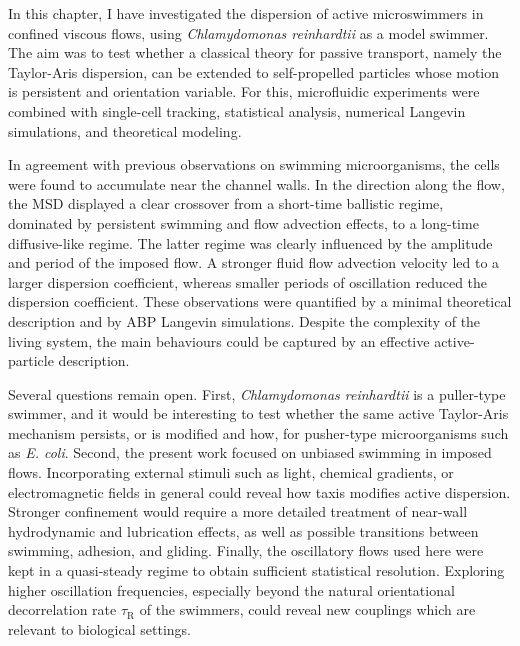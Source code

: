 In this chapter, I have investigated the dispersion of active microswimmers in confined viscous flows, using \textit{Chlamydomonas reinhardtii} as a model swimmer. The aim was to test whether a classical theory for passive transport, namely the Taylor-Aris dispersion, can be extended to self-propelled particles whose motion is persistent and orientation variable. For this, microfluidic experiments were combined with single-cell tracking, statistical analysis, numerical Langevin simulations, and theoretical modeling.

In agreement with previous observations on swimming microorganisms, the cells were found to accumulate near the channel walls. In the direction along the flow, the MSD displayed a clear crossover from a short-time ballistic regime, dominated by persistent swimming and flow advection effects, to a long-time diffusive-like regime. The latter regime was clearly influenced by the amplitude and period of the imposed flow. A stronger fluid flow advection velocity led to a larger dispersion coefficient, whereas smaller periods of oscillation reduced the dispersion coefficient. These observations were quantified by a minimal theoretical description and by ABP Langevin simulations. Despite the complexity of the living system, the main behaviours could be captured by an effective active-particle description.

Several questions remain open. First, \textit{Chlamydomonas reinhardtii} is a puller-type swimmer, and it would be interesting to test whether the same active Taylor-Aris mechanism persists, or is modified and how, for pusher-type microorganisms such as \emph{E. coli}. Second, the present work focused on unbiased swimming in imposed flows. Incorporating external stimuli such as light, chemical gradients, or electromagnetic fields in general could reveal how taxis modifies active dispersion. Stronger confinement would require a more detailed treatment of near-wall hydrodynamic and lubrication effects, as well as possible transitions between swimming, adhesion, and gliding. Finally, the oscillatory flows used here were kept in a quasi-steady regime to obtain sufficient statistical resolution. Exploring higher oscillation frequencies, especially beyond the natural orientational decorrelation rate $\tau_\mathrm{R}$ of the swimmers, could reveal new couplings which are relevant to biological settings.